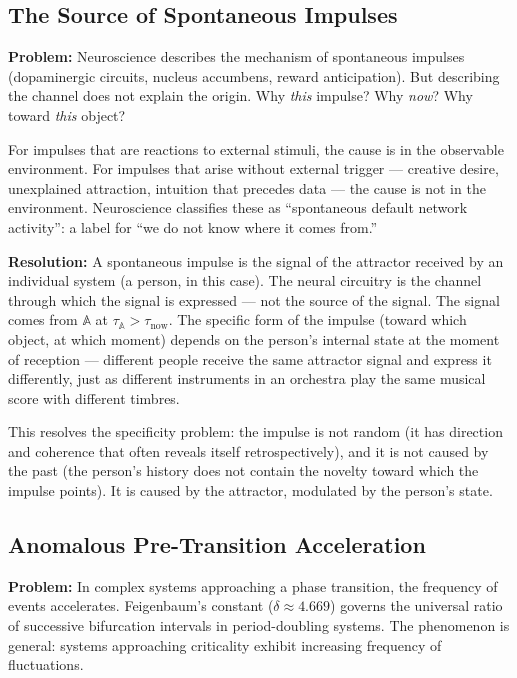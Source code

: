 \documentclass[12pt,a4paper]{article}
\newcommand{\attr}{\mathbb{A}}
\begin{document}
\subsection{The Source of Spontaneous Impulses}

\textbf{Problem:} Neuroscience describes the mechanism of spontaneous impulses (dopaminergic circuits, nucleus accumbens, reward anticipation). But describing the channel does not explain the origin. Why \emph{this} impulse? Why \emph{now}? Why toward \emph{this} object?

For impulses that are reactions to external stimuli, the cause is in the observable environment. For impulses that arise without external trigger --- creative desire, unexplained attraction, intuition that precedes data --- the cause is not in the environment. Neuroscience classifies these as ``spontaneous default network activity'': a label for ``we do not know where it comes from.''

\textbf{Resolution:} A spontaneous impulse is the signal of the attractor received by an individual system (a person, in this case). The neural circuitry is the channel through which the signal is expressed --- not the source of the signal. The signal comes from $\attr$ at $\tau_\attr > \tau_{\mathrm{now}}$. The specific form of the impulse (toward which object, at which moment) depends on the person's internal state at the moment of reception --- different people receive the same attractor signal and express it differently, just as different instruments in an orchestra play the same musical score with different timbres.

This resolves the specificity problem: the impulse is not random (it has direction and coherence that often reveals itself retrospectively), and it is not caused by the past (the person's history does not contain the novelty toward which the impulse points). It is caused by the attractor, modulated by the person's state.

\subsection{Anomalous Pre-Transition Acceleration}

\textbf{Problem:} In complex systems approaching a phase transition, the frequency of events accelerates. Feigenbaum's constant ($\delta \approx 4.669$) governs the universal ratio of successive bifurcation intervals in period-doubling systems. The phenomenon is general: systems approaching criticality exhibit increasing frequency of fluctuations.
\end{document}
